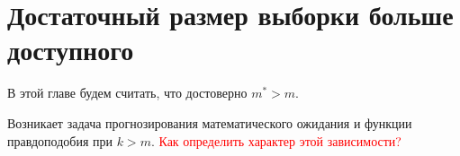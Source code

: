 \section{Достаточный размер выборки больше доступного}\label{sec3}

В этой главе будем считать, что достоверно $m^* > m$.

Возникает задача прогнозирования математического ожидания и функции правдоподобия при $k > m$. \textcolor{red}{Как определить характер этой зависимости?}